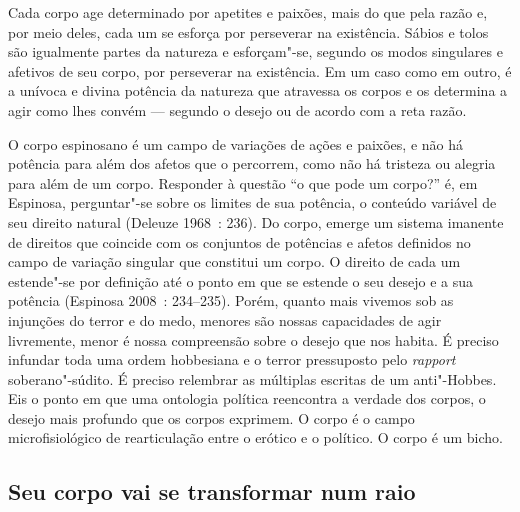 Cada corpo age determinado por apetites e paixões, mais do que pela
razão e, por meio deles, cada um se esforça por perseverar na
existência. Sábios e tolos são igualmente partes da natureza e
esforçam"-se, segundo os modos singulares e afetivos de seu corpo, por
perseverar na existência. Em um caso como em outro, é a unívoca e divina
potência da natureza que atravessa os corpos e os determina a agir como
lhes convém --- segundo o desejo ou de acordo com a reta razão.

O corpo espinosano é um campo de variações de ações e paixões, e não há
potência para além dos afetos que o percorrem, como não há tristeza ou
alegria para além de um corpo. Responder à questão ``o que pode um
corpo?'' é, em Espinosa, perguntar"-se sobre os limites de sua potência,
o conteúdo variável de seu direito natural (Deleuze 1968~: 236). Do
corpo, emerge um sistema imanente de direitos que coincide com os
conjuntos de potências e afetos definidos no campo de variação singular
que constitui um corpo. O direito de cada um estende"-se por definição
até o ponto em que se estende o seu desejo e a sua potência (Espinosa
2008~: 234--235). Porém, quanto mais vivemos sob as injunções do terror e
do medo, menores são nossas capacidades de agir livremente, menor é
nossa compreensão sobre o desejo que nos habita. É preciso infundar toda
uma ordem hobbesiana e o terror pressuposto pelo \emph{rapport}
soberano"-súdito. É preciso relembrar as múltiplas escritas de um
anti"-Hobbes. Eis o ponto em que uma ontologia política reencontra a
verdade dos corpos, o desejo mais profundo que os corpos exprimem. O
corpo é o campo microfisiológico de rearticulação entre o erótico e o
político. O corpo é um bicho.

\subsection{Seu corpo vai se transformar num raio}

